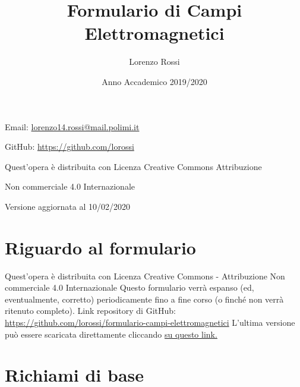 \documentclass{article}
\title{\Huge Formulario di Campi Elettromagnetici}
\author{\LARGE Lorenzo Rossi}
\date{\LARGE Anno Accademico 2019/2020}
\begin{document}
\maketitle

\vspace{18em}

\large
\begin{doublespacing}\hypersetup{
	urlcolor=black,
}
\centerline{Email: \href{mailto://lorenzo14.rossi@mail.polimi.it}{lorenzo14.rossi@mail.polimi.it}}
\centerline{GitHub: \url{https://github.com/lorossi}}

\vspace{18em}
\centerline{Quest'opera è distribuita con Licenza Creative Commons Attribuzione}
\centerline{Non commerciale 4.0 Internazionale \ccbynceu}
\centerline{Versione aggiornata al 10/02/2020}
\end{doublespacing}
\newpage


\tableofcontents
\clearpage
{}
\newpage

\section{Riguardo al formulario}
Quest'opera è distribuita con Licenza Creative Commons - Attribuzione Non commerciale 4.0 Internazionale \ccbynceu \newline
Questo formulario verrà espanso (ed, eventualmente, corretto) periodicamente fino a fine corso (o finché non verrà ritenuto completo). \newline
Link repository di GitHub: \url{https://github.com/lorossi/formulario-campi-elettromagnetici} \newline
L'ultima versione può essere scaricata direttamente cliccando \href{https://github.com/lorossi/formulario-campi-elettromagnetici/raw/master/formulario_campi.pdf}{su questo link.}

\section{Richiami di base}
\end{document}

